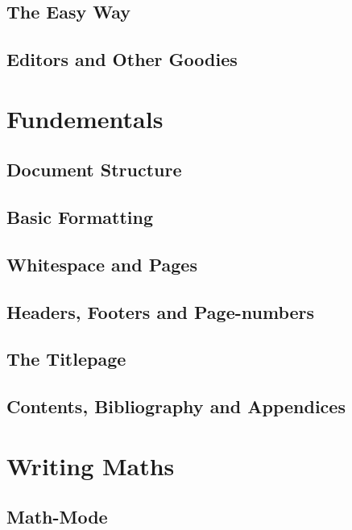 \documentclass[12pt,a4paper]{article}
\begin{document}
\subsection{The Easy Way}

\subsection{Editors and Other Goodies}

\newpage
\section{Fundementals}

\subsection{Document Structure}


\subsection{Basic Formatting}

\subsection{Whitespace and Pages}


\subsection{Headers, Footers and Page-numbers}

\subsection{The Titlepage}

\subsection{Contents, Bibliography and Appendices}

\newpage
\section{Writing Maths}

\subsection{Math-Mode}

\end{document}

